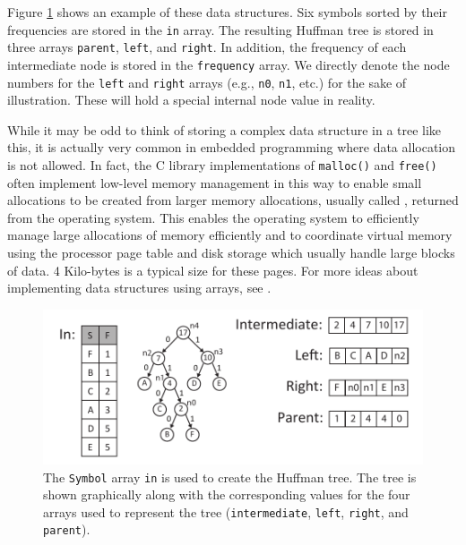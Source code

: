 Figure \ref{fig:huffman_create_tree} shows an example of these data structures. Six symbols sorted by their frequencies are stored in the \lstinline{in} array. The resulting Huffman tree is stored in three arrays \lstinline{parent}, \lstinline{left}, and \lstinline{right}.  In addition, the frequency of each intermediate node is stored in the \lstinline{frequency} array.  We directly denote the node numbers for the \lstinline{left} and \lstinline{right} arrays (e.g., \lstinline{n0}, \lstinline{n1}, etc.) for the sake of illustration. These will hold a special internal node value in reality. 

\begin{aside}
While it may be odd to think of storing a complex data structure in a tree like this, it is actually very common in embedded programming where data allocation is not allowed\cite{misra2012}.  In fact, the C library implementations of \lstinline{malloc()} and \lstinline{free()} often implement low-level memory management in this way to enable small allocations to be created from larger memory allocations, usually called , returned from the operating system.  This enables the operating system to efficiently manage large allocations of memory efficiently and to coordinate virtual memory using the processor page table and disk storage which usually handle large blocks of data.  4 Kilo-bytes is a typical size for these pages.  For more ideas about implementing data structures using arrays, see \cite{sedgewickalgorithmsinC}.
\end{aside}

\begin{figure}
\centering
\includegraphics[width= \textwidth]{images/huffman_create_tree}
\caption{ The \lstinline{Symbol} array \lstinline{in} is used to create the Huffman tree. The tree is shown graphically along with the corresponding values for the four arrays used to represent the tree (\lstinline{intermediate}, \lstinline{left}, \lstinline{right}, and \lstinline{parent}).   }
\label{fig:huffman_create_tree}
\end{figure}

